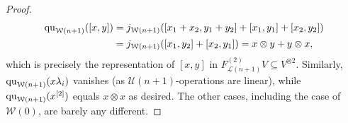 \documentclass[11pt]{amsart}
\theoremstyle{plain}
\theoremstyle{definition}
\newcommand{\calW}{\mathcal{W}}
\newcommand{\calU}{\mathcal{U}}
\newcommand{\calL}{\mathcal{L}}
\theoremstyle{plain}
\newcommand{\restn}[1]{#1^{[2]}}
\newcommand{\quadratic}{\textup{qu}}
\begin{document}
\begin{Lie algebras in characteristic 2 and their homotopy operations}
\begin{proof}
\begin{alignat*}{2}
\quadratic_{\calW(n+1)}([x,y])&=j_{\calW(n+1)}([{x_1}+{{x_2}},{y_1}+{{y_2}}]+[{x_1},{y_1}]+[{{x_2}},{{y_2}}])\\
&=j_{\calW(n+1)}([{x_1},{{y_2}}]+[{{x_2}},{y_1}])=x\otimes y+y\otimes x,
\end{alignat*}
which is precisely the representation of $[x,y]$ in $F^{(2)}_{\calL(n+1)}V\subseteq V^{\otimes2}$. Similarly, $\quadratic_{\calW(n+1)}(x\lambda_i)$ vanishes (as $\calU(n+1)$-operations are linear), while $\quadratic_{\calW(n+1)}(\restn{x})$ equals $x\otimes x$ as desired. The other cases, including the case of $\calW(0)$, are barely any different.
\end{proof}

\end{Lie algebras in characteristic 2 and their homotopy operations}
\end{document}
